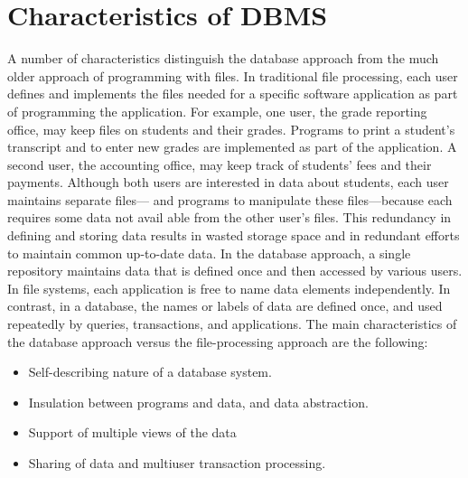 \thispagestyle{fancy}
\pagebreak

\thispagestyle{fancy}

\section{Characteristics of DBMS }
A number of characteristics distinguish the database approach from the much older approach of programming with files. In traditional file processing, each user defines and implements the files needed for a specific software application as part of programming the application. For example, one user, the grade reporting office, may keep files on students and their grades. Programs to print a student’s transcript and to enter new grades are implemented as part of the application. A second user, the accounting office, may keep track of students’ fees and their payments. Although both users are interested in data about students, each user maintains separate files— and programs to manipulate these files—because each requires some data not avail able from the other user’s files. This redundancy in defining and storing data results in wasted storage space and in redundant efforts to maintain common up-to-date data. In the database approach, a single repository maintains data that is defined once and then accessed by various users. In file systems, each application is free to name data elements independently. In contrast, in a database, the names or labels of data are defined once, and used repeatedly by queries, transactions, and applications. The main characteristics of the database approach versus the file-processing approach are the following:\\
\begin{itemize}
\item \textbf{} Self-describing nature of a database system.
\item \textbf{} Insulation between programs and data, and data abstraction. 
\item \textbf{} Support of multiple views of the data
\item \textbf{} Sharing of data and multiuser transaction processing.
\end{itemize}

